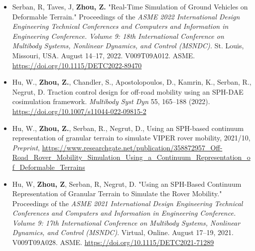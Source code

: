



\begin{footnotesize}

\begin{itemize}[leftmargin=2ex, nosep, noitemsep]
	
	
	\item {Serban, R, Taves, J, \textbf{Zhou, Z.} "Real-Time Simulation of Ground Vehicles on Deformable Terrain." Proceedings of the \textit {ASME 2022 International Design Engineering Technical Conferences and Computers and Information in Engineering Conference. Volume 9: 18th International Conference on Multibody Systems, Nonlinear Dynamics, and Control (MSNDC).} St. Louis, Missouri, USA. August 14–17, 2022. V009T09A012. ASME. \url{https://doi.org/10.1115/DETC2022-89470}}
	
	
	\item {Hu, W., \textbf{Zhou, Z.}, Chandler, S., Apostolopoulos, D., Kamrin, K., Serban, R., Negrut, D. Traction control design for off-road mobility using an SPH-DAE cosimulation framework. \textit {Multibody Syst Dyn} 55, 165–188 (2022). \url{https://doi.org/10.1007/s11044-022-09815-2}}
	
	
	\item {Hu, W., \textbf{Zhou, Z.}, Serban, R., Negrut, D., Using an SPH-based continuum representation of granular terrain to simulate VIPER rover mobility, 2021/10, \textit{Preprint}, \url{https://www.researchgate.net/publication/358872957_Off-Road_Rover_Mobility_Simulation_Using_a_Continuum_Representation_of_Deformable_Terrains}}
	
	
	\item {Hu, W, \textbf{Zhou, Z}, Serban, R, Negrut, D. "Using an SPH-Based Continuum Representation of Granular Terrain to Simulate the Rover Mobility." Proceedings of the \textit{ASME 2021 International Design Engineering Technical Conferences and Computers and Information in Engineering Conference. Volume 9: 17th International Conference on Multibody Systems, Nonlinear Dynamics, and Control (MSNDC)}. Virtual, Online. August 17–19, 2021. V009T09A028. ASME. \url{https://doi.org/10.1115/DETC2021-71289}}

\end{itemize}
	
\end{footnotesize}


